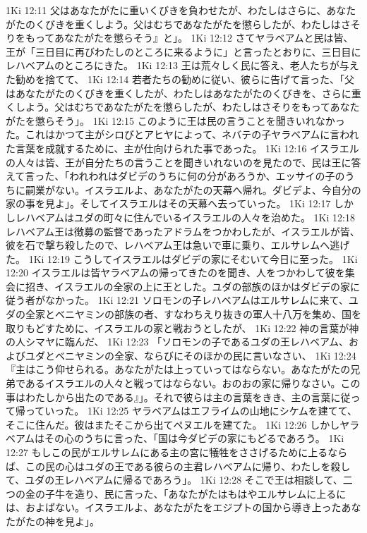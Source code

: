 1Ki 12:11  父はあなたがたに重いくびきを負わせたが、わたしはさらに、あなたがたのくびきを重くしよう。父はむちであなたがたを懲らしたが、わたしはさそりをもってあなたがたを懲らそう』と」。
1Ki 12:12  さてヤラベアムと民は皆、王が「三日目に再びわたしのところに来るように」と言ったとおりに、三日目にレハベアムのところにきた。
1Ki 12:13  王は荒々しく民に答え、老人たちが与えた勧めを捨てて、
1Ki 12:14  若者たちの勧めに従い、彼らに告げて言った、「父はあなたがたのくびきを重くしたが、わたしはあなたがたのくびきを、さらに重くしよう。父はむちであなたがたを懲らしたが、わたしはさそりをもってあなたがたを懲らそう」。
1Ki 12:15  このように王は民の言うことを聞きいれなかった。これはかつて主がシロびとアヒヤによって、ネバテの子ヤラベアムに言われた言葉を成就するために、主が仕向けられた事であった。
1Ki 12:16  イスラエルの人々は皆、王が自分たちの言うことを聞きいれないのを見たので、民は王に答えて言った、「われわれはダビデのうちに何の分があろうか、エッサイの子のうちに嗣業がない。イスラエルよ、あなたがたの天幕へ帰れ。ダビデよ、今自分の家の事を見よ」。そしてイスラエルはその天幕へ去っていった。
1Ki 12:17  しかしレハベアムはユダの町々に住んでいるイスラエルの人々を治めた。
1Ki 12:18  レハベアム王は徴募の監督であったアドラムをつかわしたが、イスラエルが皆、彼を石で撃ち殺したので、レハベアム王は急いで車に乗り、エルサレムへ逃げた。
1Ki 12:19  こうしてイスラエルはダビデの家にそむいて今日に至った。
1Ki 12:20  イスラエルは皆ヤラベアムの帰ってきたのを聞き、人をつかわして彼を集会に招き、イスラエルの全家の上に王とした。ユダの部族のほかはダビデの家に従う者がなかった。
1Ki 12:21  ソロモンの子レハベアムはエルサレムに来て、ユダの全家とベニヤミンの部族の者、すなわちえり抜きの軍人十八万を集め、国を取りもどすために、イスラエルの家と戦おうとしたが、
1Ki 12:22  神の言葉が神の人シマヤに臨んだ、
1Ki 12:23  「ソロモンの子であるユダの王レハベアム、およびユダとベニヤミンの全家、ならびにそのほかの民に言いなさい、
1Ki 12:24  『主はこう仰せられる。あなたがたは上っていってはならない。あなたがたの兄弟であるイスラエルの人々と戦ってはならない。おのおの家に帰りなさい。この事はわたしから出たのである』」。それで彼らは主の言葉をきき、主の言葉に従って帰っていった。
1Ki 12:25  ヤラベアムはエフライムの山地にシケムを建てて、そこに住んだ。彼はまたそこから出てペヌエルを建てた。
1Ki 12:26  しかしヤラベアムはその心のうちに言った、「国は今ダビデの家にもどるであろう。
1Ki 12:27  もしこの民がエルサレムにある主の宮に犠牲をささげるために上るならば、この民の心はユダの王である彼らの主君レハベアムに帰り、わたしを殺して、ユダの王レハベアムに帰るであろう」。
1Ki 12:28  そこで王は相談して、二つの金の子牛を造り、民に言った、「あなたがたはもはやエルサレムに上るには、およばない。イスラエルよ、あなたがたをエジプトの国から導き上ったあなたがたの神を見よ」。
